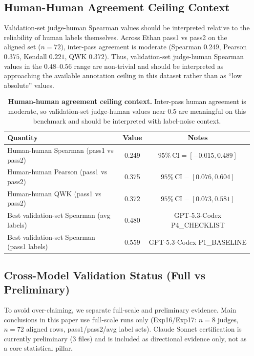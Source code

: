 \documentclass{article}
\begin{document}
\subsection{Human-Human Agreement Ceiling Context}
Validation-set judge-human Spearman values should be interpreted relative to the reliability of human labels themselves.
Across Ethan pass1 vs pass2 on the aligned set (\(n=72\)), inter-pass agreement is moderate (Spearman \(0.249\), Pearson \(0.375\), Kendall \(0.221\), QWK \(0.372\)).
Thus, validation-set judge-human Spearman values in the \(0.48\)--\(0.56\) range are non-trivial and should be interpreted as approaching the available annotation ceiling in this dataset rather than as ``low absolute'' values.

\begin{table}[t]
  \centering
  \small
  \begin{tabular}{lcc}
    \toprule
    \textbf{Quantity}                           & \textbf{Value} & \textbf{Notes}                      \\
    \midrule
    Human-human Spearman (pass1 vs pass2)       & 0.249          & \(95\%\ \text{CI}=[-0.015, 0.489]\) \\
    Human-human Pearson (pass1 vs pass2)        & 0.375          & \(95\%\ \text{CI}=[0.076, 0.604]\)  \\
    Human-human QWK (pass1 vs pass2)            & 0.372          & \(95\%\ \text{CI}=[0.073, 0.581]\)  \\
    Best validation-set Spearman (avg labels)   & 0.480          & GPT-5.3-Codex P4\_CHECKLIST         \\
    Best validation-set Spearman (pass1 labels) & 0.559          & GPT-5.3-Codex P1\_BASELINE          \\
    \bottomrule
  \end{tabular}
  \caption{\textbf{Human-human agreement ceiling context.}
    Inter-pass human agreement is moderate, so validation-set judge-human values near \(0.5\) are meaningful on this benchmark and should be interpreted with label-noise context.}
  \label{tab:app-human-human-ceiling}
\end{table}

\subsection{Cross-Model Validation Status (Full vs Preliminary)}
To avoid over-claiming, we separate full-scale and preliminary evidence.
Main conclusions in this paper use full-scale runs only (Exp16/Exp17: \(n=8\) judges, \(n=72\) aligned rows, pass1/pass2/avg label sets).
Claude Sonnet certification is currently preliminary (\(3\) files) and is included as directional evidence only, not as a core statistical pillar.
\end{document}
